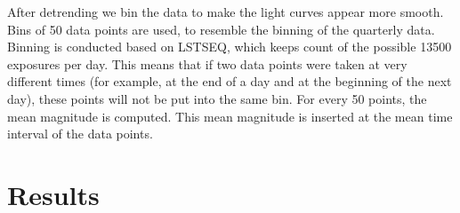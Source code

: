 \documentclass{aa}
\begin{document}
After detrending we bin the data to make the light curves appear more smooth. Bins of 50 data points are used, to resemble the binning of the quarterly data. Binning is conducted based on LSTSEQ, which keeps count of the possible 13500 exposures per day. This means that if two data points were taken at very different times (for example, at the end of a day and at the beginning of the next day), these points will not be put into the same bin. For every 50 points, the mean magnitude is computed. This mean magnitude is inserted at the mean time interval of the data points.






\section{Results}
\label{sec:results}
\end{document}
